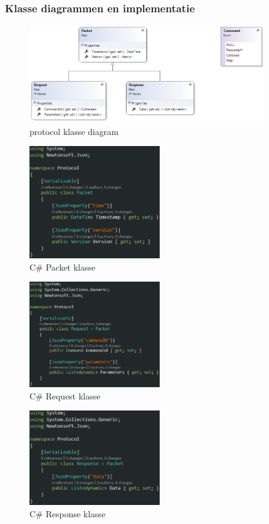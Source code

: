 \documentclass[11pt]{report}
\begin{document}
\subsubsection{Klasse diagrammen en implementatie}
\begin{figure}[H]
  \centering
  \includegraphics[width=0.9\textwidth]{protocol_diagrams.png}
  \caption{protocol klasse diagram}
\end{figure}
\begin{figure}[H]
  \centering
  \includegraphics[width=0.5\textwidth]{csharp_packet.png}
  \caption{C\# Packet klasse}
\end{figure}
\begin{figure}[H]
  \centering
  \includegraphics[width=0.5\textwidth]{csharp_request.png}
  \caption{C\# Request klasse}
\end{figure}
\begin{figure}[H]
  \centering
  \includegraphics[width=0.5\textwidth]{csharp_response.png}
  \caption{C\# Response klasse}
\end{figure}
\end{document}
